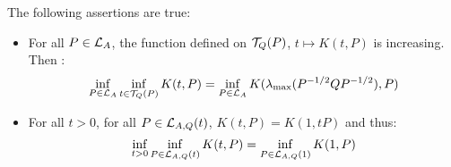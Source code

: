 \documentclass[10pt]{llncs}
\begin{document}
%
%

\begin{prop}
\label{comp-prop}
The following assertions are true:
\begin{itemize}
\item For all $P\in\mathcal{L}_{A}$, the function defined on $\mathcal{T}_{Q}(P)$, $t\mapsto K(t,P)$ is increasing. Then : 
\begin{equation}
\label{infsolved}
\inf_{P\in\mathcal{L}_{A}} \inf_{t\in\mathcal{T}_{Q}(P)} K(t,P)=\inf_{P\in\mathcal{L}_{A}}K(\lambda_{\operatorname{max}}(P^{-1/2} Q P^{-1/2}),P)
\end{equation}
\item For all $t>0$, for all $P\in\mathcal{L}_{A,Q}(t)$, $K(t,P)=K(1,tP)$ and thus:
\[
\inf_{t>0} \inf_{P\in\mathcal{L}_{A,Q}(t)} K(t,P)=\inf_{P\in\mathcal{L}_{A,Q}(1)} K(1,P)
\]
\end{itemize}
\end{prop}
\end{document}

